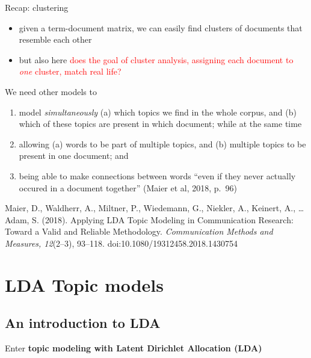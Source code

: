 \documentclass[compress]{beamer}
\begin{document}
\begin{frame}{Recap: clustering}
\begin{itemize}
	\item given a term-document matrix, we can easily find clusters of documents that resemble each other
	\item but also here \textcolor{red}{does the goal of cluster analysis, assigning each document to \emph{one} cluster, match real life?}
\end{itemize}
\end{frame}


\begin{frame}{We need other models to}
\begin{enumerate}[<+->]
	\item model \emph{simultaneously} (a) which topics we find in the whole corpus, and (b) which of these topics are present in which document; while at the same time
	\item allowing (a) words to be part of multiple topics, and (b) multiple topics to be present in one document; and
	\item being able to make connections between words ``even if they never actually occured in a document together'' (Maier et al, 2018, p.~96)
\end{enumerate}

\tiny{Maier, D., Waldherr, A., Miltner, P., Wiedemann, G., Niekler, A., Keinert, A., \ldots Adam, S. (2018). Applying LDA Topic Modeling in Communication Research: Toward a Valid and Reliable Methodology. \textit{Communication Methods and Measures, 12}(2--3), 93--118. doi:10.1080/19312458.2018.1430754}
\end{frame}



\section{LDA Topic models}

\subsection{An introduction to LDA}

\begin{frame}{}
	Enter \textbf{topic modeling with Latent Dirichlet Allocation (LDA)}
\end{frame}
\end{document}
